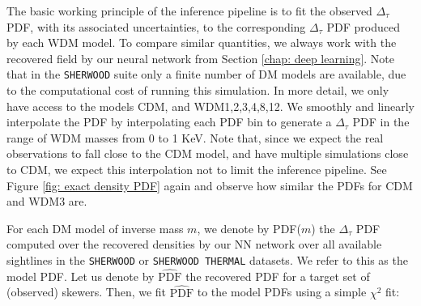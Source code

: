 The basic working principle of the inference pipeline is to fit the observed $\Delta_\tau$ PDF, with its associated uncertainties, to the corresponding $\Delta_\tau$ PDF produced by each WDM model. To compare similar quantities, we always work with the recovered field by our neural network from Section \ref{chap: deep learning}. Note that in the \texttt{SHERWOOD} suite only a finite number of DM models are available, due to the computational cost of running this simulation. In more detail, we only have access to the models CDM, and WDM1,2,3,4,8,12. We smoothly and linearly interpolate the PDF by interpolating each PDF bin to generate a $\Delta_\tau$ PDF in the range of WDM masses from 0 to 1 KeV. Note that, since we expect the real observations to fall close to the CDM model, and have multiple simulations close to CDM, we expect this interpolation not to limit the inference pipeline. See Figure \ref{fig: exact density PDF} again and observe how similar the PDFs for CDM and WDM3 are.

For each DM model of inverse mass $m$, we denote by PDF($m$)  the $\Delta_\tau$ PDF computed over the recovered densities by our NN network over all available sightlines in the \texttt{SHERWOOD} or \texttt{SHERWOOD THERMAL} datasets. We refer to this as the model PDF. Let us denote by $\widehat{\text{PDF}}$ the recovered PDF for a target set of (observed) skewers. Then, we fit $\widehat{\text{PDF}}$ to the model PDFs using a simple $\chi^2$ fit:

